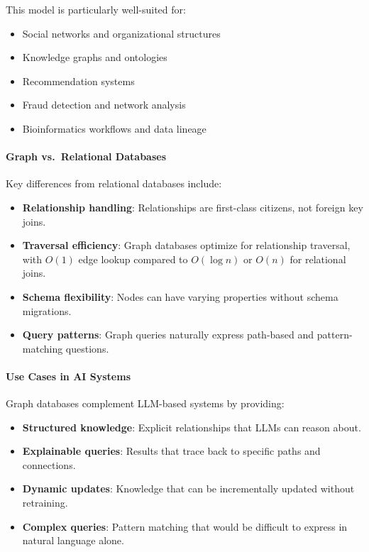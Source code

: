 This model is particularly well-suited for:
\begin{itemize}
    \item Social networks and organizational structures
    \item Knowledge graphs and ontologies
    \item Recommendation systems
    \item Fraud detection and network analysis
    \item Bioinformatics workflows and data lineage
\end{itemize}

\paragraph{Graph vs.\ Relational Databases}

Key differences from relational databases include:

\begin{itemize}
    \item \textbf{Relationship handling}: Relationships are first-class citizens, not foreign key joins.
    \item \textbf{Traversal efficiency}: Graph databases optimize for relationship traversal, with $O(1)$ edge lookup compared to $O(\log n)$ or $O(n)$ for relational joins.
    \item \textbf{Schema flexibility}: Nodes can have varying properties without schema migrations.
    \item \textbf{Query patterns}: Graph queries naturally express path-based and pattern-matching questions.
\end{itemize}

\paragraph{Use Cases in AI Systems}

Graph databases complement LLM-based systems by providing:
\begin{itemize}
    \item \textbf{Structured knowledge}: Explicit relationships that LLMs can reason about.
    \item \textbf{Explainable queries}: Results that trace back to specific paths and connections.
    \item \textbf{Dynamic updates}: Knowledge that can be incrementally updated without retraining.
    \item \textbf{Complex queries}: Pattern matching that would be difficult to express in natural language alone.
\end{itemize}

